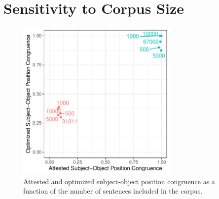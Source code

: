 \documentclass[11pt,a4paper]{article}
\begin{document}
\section{Sensitivity to Corpus Size}



\begin{figure}
    \centering
    \includegraphics[width=0.7\textwidth]{../analysis/subset/figures/by-corpus-size.pdf}
    \caption{Attested and optimized subject-object position congruence as a function of the number of sentences included in the corpus.}
    \label{fig:congruence-by-size}
\end{figure}




\end{document}
